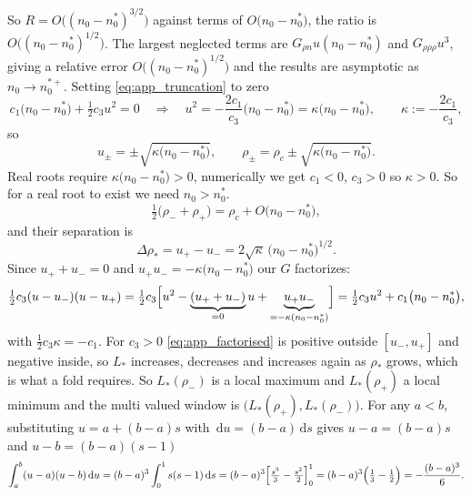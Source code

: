 \documentclass[11pt,a4paper]{report}
\newcommand{\dd}{\,\mathrm d}
\begin{document}
So $R=O\bigl((n_0-n_0^{*})^{3/2}\bigr)$ against terms of
$O\bigl(n_0-n_0^{*}\bigr)$, the ratio is $O\bigl((n_0-n_0^{*})^{1/2}\bigr)$. The largest neglected terms are $G_{\rho n}u(n_0-n_0^{*})$ and $G_{\rho\rho\rho}u^3$, giving a relative error
$O\bigl((n_0-n_0^{*})^{1/2}\bigr)$ and the results are asymptotic as $n_0\to n_0^{*+}$.
Setting \eqref{eq:app_truncation} to zero
\begin{equation}
	c_1\bigl(n_0-n_0^{*}\bigr)+\tfrac12c_3u^2=0
	\quad\Longrightarrow\quad
	u^2=-\frac{2c_1}{c_3}\bigl(n_0-n_0^{*}\bigr)
	=\kappa\bigl(n_0-n_0^{*}\bigr),
	\qquad
	\kappa:=-\frac{2c_1}{c_3},
	\label{eq:app_quadratic}
\end{equation}
so
\begin{equation}
	u_{\pm}=\pm\sqrt{\kappa\bigl(n_0-n_0^{*}\bigr)},
	\qquad
	\rho_{\pm}=\rho_c\pm\sqrt{\kappa\bigl(n_0-n_0^{*}\bigr)}.
	\label{eq:app_roots}
\end{equation}
Real roots require $\kappa\bigl(n_0-n_0^{*}\bigr)>0$, numerically we get $c_1<0$, $c_3>0$ so $\kappa>0$. So for a real root to exist we need $n_0>n_0^{*}$.
\begin{equation}
	\tfrac12\bigl(\rho_-+\rho_+\bigr)=\rho_c+O\!\bigl(n_0-n_0^{*}\bigr),
	\label{eq:app_midpoint}
\end{equation}
and their separation is
\begin{equation}
	\Delta\rho_*=u_+-u_-=2\sqrt{\kappa}\,\bigl(n_0-n_0^{*}\bigr)^{1/2}.
	\label{eq:app_separation}
\end{equation}
Since $u_++u_-=0$ and $u_+u_-=-\kappa\bigl(n_0-n_0^{*}\bigr)$ our $G$ factorizes:
\begin{equation}
	\tfrac12c_3(u-u_-)(u-u_+)
	=\tfrac12c_3\Bigl[u^2-\underbrace{(u_++u_-)}_{=0}u+\underbrace{u_+u_-}_{=-\kappa(n_0-n_0^{*})}\Bigr]
	=\tfrac12c_3u^2+c_1\bigl(n_0-n_0^{*}\bigr),
	\label{eq:app_factorised}
\end{equation}
with $\tfrac12c_3\kappa=-c_1$.
For $c_3>0$ \eqref{eq:app_factorised} is positive outside $[u_-,u_+]$ and negative inside,
so $L_*$ increases, decreases and increases again as $\rho_*$ grows, which is what a fold requires. So
$L_*(\rho_-)$ is a local maximum and $L_*(\rho_+)$ a local minimum and the multi valued
window is $\bigl(L_*(\rho_+),L_*(\rho_-)\bigr)$.
For any $a<b$, substituting $u=a+(b-a)s$ with $\dd u=(b-a)\dd s$ gives
$u-a=(b-a)s$ and $u-b=(b-a)(s-1)$
\begin{equation}
	\int_a^b(u-a)(u-b)\dd u
	=(b-a)^3\int_0^1 s(s-1)\dd s
	=(b-a)^3\Bigl[\tfrac{s^3}{3}-\tfrac{s^2}{2}\Bigr]_0^1
	=(b-a)^3\Bigl(\tfrac13-\tfrac12\Bigr)
	=-\frac{(b-a)^3}{6}.
	\label{eq:app_lemma}
\end{equation}
\end{document}
